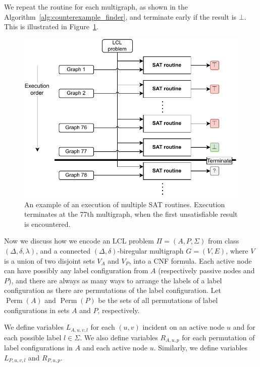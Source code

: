 We repeat the routine for each multigraph, as shown in the Algorithm~\ref{alg:counterexample_finder}, and terminate early if the result is $\bot$.
This is illustrated in Figure~\ref{fig:implementation:2}.

\begin{figure}[H]
\centering
\includegraphics[]{diagrams/implementation_idea_diagram3a.pdf}
\caption{An example of an execution of multiple SAT routines. Execution terminates at the 77th multigraph, when the first unsatisfiable result is encountered.}
\label{fig:implementation:2}
\end{figure}

Now we discuss how we encode an LCL problem $\Pi=(A, P, \Sigma)$ from class $(\Delta, \delta, \lambda)$, and a connected $(\Delta, \delta)$-biregular multigraph $G=(V,E)$, where $V$ is a union of two disjoint sets $V_A$ and $V_P$, into a CNF formula.
Each active node can have possibly any label configuration from $A$ (respectively passive nodes and $P$), and there are always as many ways to arrange the labels of a label configuration as there are permutations of the label configuration.
Let $\operatorname{Perm}(A)$ and $\operatorname{Perm}(P)$ be the sets of all permutations of label configurations in sets $A$ and $P$, respectively.

We define variables $L_{A,u,v,l}$ for each $(u, v)$ incident on an active node $u$ and for each possible label $l \in \Sigma$.
We also define variables $R_{A, u, p}$ for each permutation of label configurations in $A$ and each active node $u$.
Similarly, we define variables $L_{P,u,v,l}$ and $R_{P, u, p}$.

